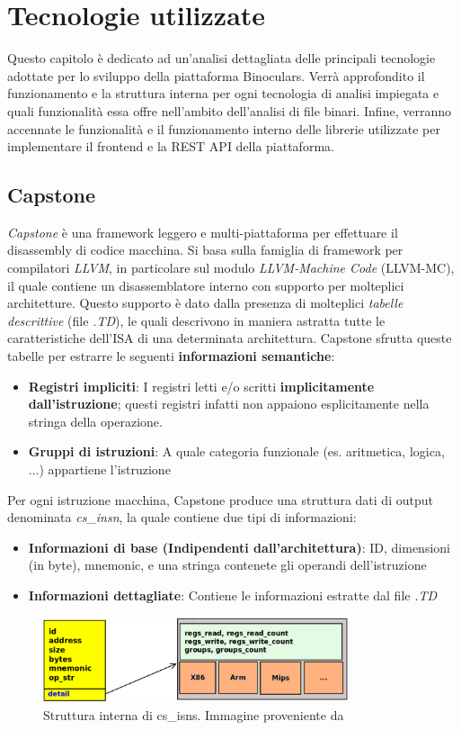 \documentclass[../main.tex]{subfiles}
\begin{document}
\chapter{Tecnologie utilizzate}
\label{chap:conclusion}
Questo capitolo è dedicato ad un'analisi dettagliata delle principali tecnologie adottate per lo sviluppo della piattaforma Binoculars.
Verrà approfondito il funzionamento e la struttura interna per ogni tecnologia di analisi impiegata e quali funzionalità essa offre nell'ambito dell'analisi di
file binari. Infine, verranno accennate le funzionalità e il funzionamento interno delle librerie utilizzate per implementare il frontend e la REST API della piattaforma. 
\section{Capstone}
\textit{Capstone} \cite{Capstone_docs} è una framework leggero e multi-piattaforma per effettuare il disassembly di codice macchina.
Si basa sulla famiglia di framework per compilatori \textit{LLVM}, in particolare sul modulo \textit{LLVM-Machine Code} (LLVM-MC), il quale contiene un disassemblatore interno con supporto
per molteplici architetture. Questo supporto è dato dalla presenza di molteplici \textit{tabelle descrittive} (file \textit{.TD}), le quali descrivono in maniera astratta tutte le caratteristiche
dell'ISA di una determinata architettura. 
Capstone sfrutta queste tabelle per estrarre le seguenti \textbf{informazioni semantiche}:
\begin{itemize}
    \item \textbf{Registri impliciti}: I registri letti e/o scritti \textbf{implicitamente dall'istruzione}; questi registri infatti non appaiono esplicitamente nella stringa della operazione.
    \item \textbf{Gruppi di istruzioni}: A quale categoria funzionale (es. aritmetica, logica, ...) appartiene l'istruzione
\end{itemize}
Per ogni istruzione macchina, Capstone produce una struttura dati di output denominata \textit{cs\_insn}, la quale contiene due tipi di informazioni:
\begin{itemize}
    \item \textbf{Informazioni di base (Indipendenti dall'architettura)}: ID, dimensioni (in byte), mnemonic, e una stringa contenete gli operandi dell'istruzione
    \item \textbf{Informazioni dettagliate}: Contiene le informazioni estratte dal file \textit{.TD}
\end{itemize} 
\begin{figure}[H]
    \centering
    \includegraphics[width = 0.80\textwidth]{../images/cs_isns.png}
    \caption{Struttura interna di cs\_isns. Immagine proveniente da \cite{Capstone_docs}}
\end{figure}
\end{document}
